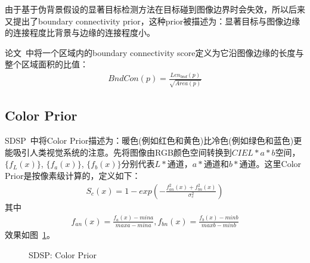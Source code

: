 \documentclass[12pt]{article}
\begin{document}
由于基于伪背景假设的显著目标检测方法在目标碰到图像边界时会失效，所以后来又提出了boundary connectivity prior，这种prior被描述为：显著目标与图像边缘的连接程度比背景与边缘的连接程度小。

论文~\cite{zhu2014saliency}中将一个区域内的boundary connectivity score定义为它沿图像边缘的长度与整个区域面积的比值：
\begin{align}
BndCon(p) = \frac{Len_{bnd}(p)}{\sqrt{Area(p)}}
\end{align}

\subsection{Color Prior}

SDSP~\cite{zhang2013sdsp}中将Color Prior描述为：暖色(例如红色和黄色)比冷色(例如绿色和蓝色)更能吸引人类视觉系统的注意。先将图像由RGB颜色空间转换到$CIEL*a*b$空间，$\{ f_L(x)\}$, $\{ f_a(x)\}$, $\{ f_b(x)\}$分别代表$L*$通道，$a*$通道和$b*$通道。这里Color Prior是按像素级计算的，定义如下：
\begin{align}
S_c(x) = 1-exp\left(-\frac{f_{an}^2(x)+f_{bn}^2(x)}{\sigma_c^2}\right)
\end{align}
其中
\begin{align}
f_{an}(x)=\frac{f_a(x)-mina}{maxa-mina}, f_{bn}(x) = \frac{f_b(x)-minb}{maxb-minb}
\end{align}
效果如图~\ref{fig: SDSPColorPrior}。
\begin{figure}
  \centering 
  \caption{SDSP: Color Prior}
  \label{fig: SDSPColorPrior} %
\end{figure}
\end{document}
